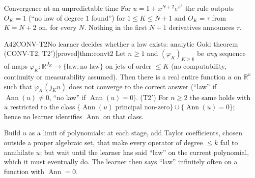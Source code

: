 \documentclass[11pt,a4paper,oneside]{report}
\newcommand{\badge}[2]{\textcolor{#1}{\textsf{\footnotesize[#2]}}}
\newcommand{\proved}{\badge{cC}{proved}}
\newcommand{\R}{\mathbb{R}}\newcommand{\C}{\mathbb{C}}\newcommand{\N}{\mathbb{N}}\newcommand{\Z}{\mathbb{Z}}\newcommand{\Q}{\mathbb{Q}}
\newcommand{\Ann}{\operatorname{Ann}}
\newenvironment{dimcard}[5]{\par\Needspace{12\baselineskip}\begin{dimcardbox}{#1}{#2}{#3}{#4}{#5}}{\end{dimcardbox}}
\begin{document}
\begin{example}{Convergence at an unpredictable time}
For $u=1+x^{N+2}e^{x^2}$ the rule outputs $O_K=1$ (``no law of degree $1$ found'') for $1\le K\le N+1$ and $O_K=\tau$ from $K=N+2$ on, for every $N$. Nothing in the first $N+1$ derivatives announces $\tau$.
\end{example}

\begin{dimcard}{A42}{CONV-T2}{No learner decides whether a law exists: analytic Gold theorem (CONV-T2, T2$'$)}{\proved}{thm:convt2}
Let $n\ge1$ and $(\varphi_K)_{K\ge0}$ be \emph{any} sequence of maps $\varphi_K:\R^{J_K}\to\{\text{law},\text{no law}\}$ on jets of order $\le K$ (no computability, continuity or measurability assumed). Then there is a real entire function $u$ on $\R^n$ such that $\varphi_K(j_Ku)$ does not converge to the correct answer (``law'' if $\Ann(u)\ne0$, ``no law'' if $\Ann(u)=0$). (T2$'$) For $n\ge2$ the same holds with $u$ restricted to the class $\{\Ann(u)\text{ principal non-zero}\}\cup\{\Ann(u)=0\}$; hence no learner identifies $\Ann$ on that class.
\end{dimcard}

\begin{proofidea}
Build $u$ as a limit of polynomials: at each stage, add Taylor coefficients, chosen outside a proper algebraic set, that make every operator of degree $\le k$ fail to annihilate $u$; but wait until the learner has said ``law'' on the current polynomial, which it must eventually do. The learner then says ``law'' infinitely often on a function with $\Ann=0$.
\end{proofidea}
\end{document}
